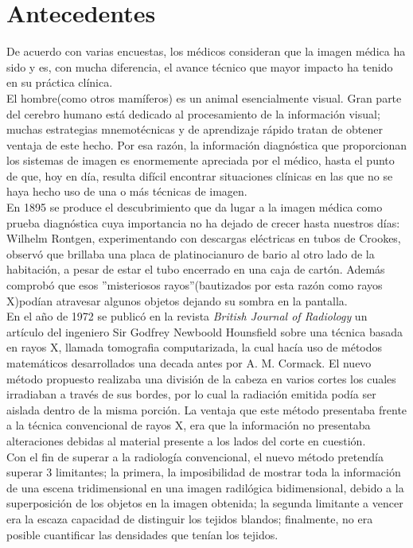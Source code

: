 \documentclass[12pt]{report}
\begin{document}
\section{Antecedentes}
De acuerdo con varias encuestas, los médicos consideran que la imagen médica ha sido y es, con mucha diferencia, el avance técnico que mayor impacto ha tenido en su práctica clínica.\\

El hombre(como otros mamíferos) es un animal esencialmente visual. Gran parte del cerebro humano está dedicado al procesamiento de la información visual; muchas estrategias mnemotécnicas y de aprendizaje rápido tratan de obtener ventaja de este hecho. Por esa razón, la información diagnóstica que proporcionan los sistemas de imagen es enormemente apreciada por el médico, hasta el punto de que, hoy en día, resulta difícil encontrar situaciones clínicas en las que no se haya hecho uso de una o más técnicas de imagen.\\ 

En 1895 se produce el descubrimiento que da lugar a la imagen médica como prueba diagnóstica cuya importancia no ha dejado de crecer hasta nuestros días: Wilhelm Rontgen, experimentando con descargas eléctricas en tubos de Crookes, observó que brillaba una placa de platinocianuro de bario al otro lado de la habitación, a pesar de estar el tubo encerrado en una caja de cartón. Además comprobó que esos ''misteriosos rayos''(bautizados por esta razón como rayos X)podían atravesar algunos objetos dejando su sombra en la pantalla.\cite{biom}\\ 

En el año de 1972 se publicó en la revista \textit{British Journal of Radiology} un artículo del ingeniero Sir Godfrey Newboold Hounsfield sobre una
técnica basada en rayos X, llamada tomografia computarizada, la cual hacía uso de métodos matemáticos desarrollados una decada antes por A. M. Cormack.
El nuevo método propuesto realizaba una división de la cabeza en varios cortes los cuales irradiaban a través de sus bordes, por lo cual la radiación emitida podía ser aislada dentro de la misma porción. La ventaja que este método presentaba frente a la técnica convencional de rayos X, era que la información no presentaba alteraciones debidas al material presente a los lados del corte en cuestión.\\ 

Con el fin de superar a la radiología convencional, el nuevo método pretendía superar 3 limitantes; la primera, la imposibilidad de mostrar toda la información de una escena tridimensional en una imagen radilógica bidimensional, debido a la superposición de los objetos en la imagen obtenida; la segunda limitante a vencer era la escaza capacidad de distinguir los tejidos blandos; finalmente, no era posible cuantificar las densidades que tenían los tejidos.\cite{TCFundamentos}  \\ 
\end{document}
